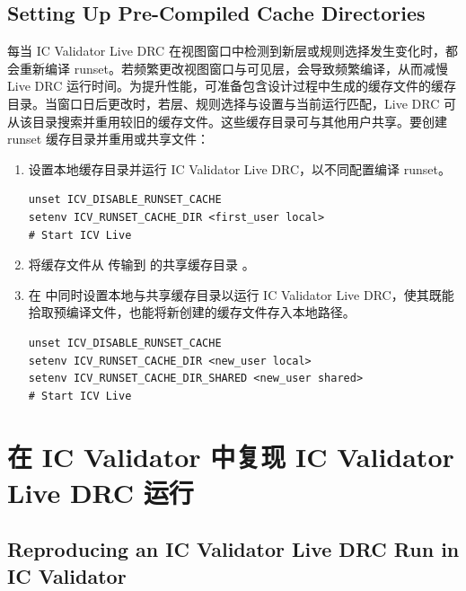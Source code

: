 \subsection*{Setting Up Pre-Compiled Cache Directories}

每当 IC Validator Live DRC 在视图窗口中检测到新层或规则选择发生变化时，都会重新编译 runset。若频繁更改视图窗口与可见层，会导致频繁编译，从而减慢 Live DRC 运行时间。为提升性能，可准备包含设计过程中生成的缓存文件的缓存目录。当窗口日后更改时，若层、规则选择与设置与当前运行匹配，Live DRC 可从该目录搜索并重用较旧的缓存文件。这些缓存目录可与其他用户共享。要创建 runset 缓存目录并重用或共享文件：
\begin{enumerate}
  \item 设置本地缓存目录并运行 IC Validator Live DRC，以不同配置编译 runset。
\begin{lstlisting}
unset ICV_DISABLE_RUNSET_CACHE
setenv ICV_RUNSET_CACHE_DIR <first_user local>
# Start ICV Live
\end{lstlisting}
  \item 将缓存文件从  传输到  的共享缓存目录 。
  \item 在  中同时设置本地与共享缓存目录以运行 IC Validator Live DRC，使其既能拾取预编译文件，也能将新创建的缓存文件存入本地路径。
\begin{lstlisting}
unset ICV_DISABLE_RUNSET_CACHE
setenv ICV_RUNSET_CACHE_DIR <new_user local>
setenv ICV_RUNSET_CACHE_DIR_SHARED <new_user shared>
# Start ICV Live
\end{lstlisting}
\end{enumerate}

\section{在 IC Validator 中复现 IC Validator Live DRC 运行}
\subsection*{Reproducing an IC Validator Live DRC Run in IC Validator}

